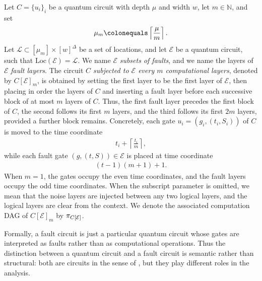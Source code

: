 \begin{definition}
  Let $C=\{u_i\}_i$ be a quantum circuit with depth $\mu$ and width $w$, let $m\in\mathbb{N}$, and set
  \begin{equation*}
    \begin{split}
      \mu_m \colonequals \left\lceil \frac{\mu}{m} \right\rceil.
    \end{split}
  \end{equation*}
  Let $\mathcal{L}\subset [\mu_m]\times [w]^{\Delta}$ be a set of locations, and let $\mathcal{E}$ be a quantum circuit, such that $\text{Loc}(\mathcal{E}) = \mathcal{L}$. We name $\mathcal{E}$ \textit{subsets of faults}, and we name the layers of $\mathcal{E}$ \textit{fault layers}.
  The circuit \textit{$C$ subjected to $\mathcal{E}$ every $m$ computational layers}, denoted by $C[\mathcal{E}]_{m}$, is obtained by setting the first layer to be the first layer of $\mathcal{E}$, then placing in order the layers of $C$ and inserting a fault layer before each successive block of at most $m$ layers of $C$. Thus, the first fault layer precedes the first block of $C$, the second follows its first $m$ layers, and the third follows its first $2m$ layers, provided a further block remains. Concretely, each gate $u_i=(g_i,(t_i,S_i))$ of $C$ is moved to the time coordinate
  \begin{equation*}
    \begin{split}
      t_i + \left\lceil \frac{t_i}{m} \right\rceil,
    \end{split}
  \end{equation*}
  while each fault gate $(g,(t,S))\in\mathcal{E}$ is placed at time coordinate
  \begin{equation*}
    \begin{split}
      (t-1)(m+1)+1.
    \end{split}
  \end{equation*}
When $m=1$, the gates occupy the even time coordinates, and the fault layers occupy the odd time coordinates. When the subscript parameter is omitted, we mean that the noise layers are injected between any two logical layers, and the logical layers are clear from the context. We denote the associated computation DAG of $C[\mathcal{E}]_{m}$ by $\pi_{C[\mathcal{E}]}$.
\end{definition}



\begin{remark}
  Formally, a fault circuit is just a particular quantum circuit whose gates are interpreted as faults rather than as computational operations. Thus the distinction between a quantum circuit and a fault circuit is semantic rather than structural: both are circuits in the sense of , but they play different roles in the analysis.
\end{remark}

